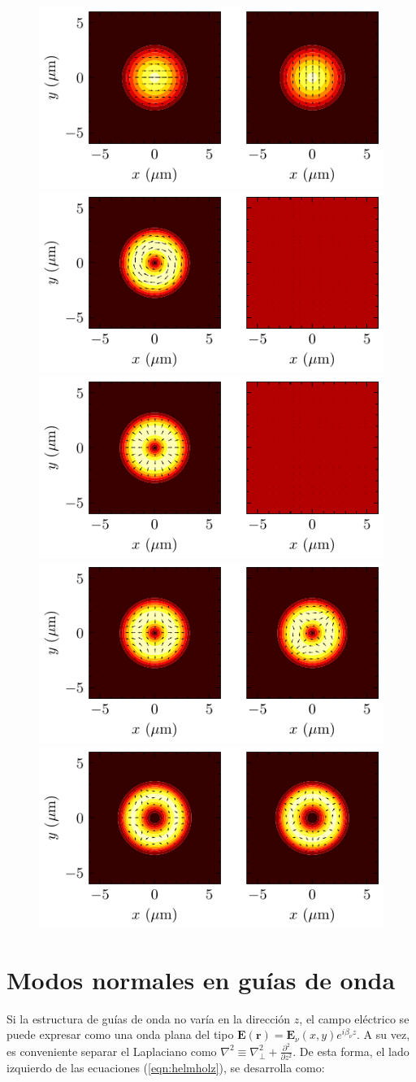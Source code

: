 \begin{figure}[H]
	\includegraphics[width=0.5\linewidth, trim={0 0 3.5cm 0},clip]{media/fiberHE11.pdf}
	\includegraphics[width=0.33\linewidth, trim={1.2cm 0 3.9cm 0},clip]{media/fiberTE1.pdf}
	\includegraphics[width=0.33\linewidth, trim={1.2cm 0 3.9cm 0},clip]{media/fiberTM1.pdf}
		\includegraphics[width=0.33\linewidth, trim={1.2cm 0 3.9cm 0},clip]{media/fiberHE21.pdf}
		\includegraphics[width=0.33\linewidth, trim={1.2cm 0 3.9cm 0},clip]{media/fiberHE31.pdf}
		
\end{figure}

\section{Modos normales en guías de onda}

Si la estructura de guías de onda no varía en la dirección $z$, el campo eléctrico se puede expresar como una onda plana del tipo $\textbf{E}(\textbf{r}) = \textbf{E}_\nu(x, y) e^{i\beta_\nu z}$. A su vez, es conveniente separar el Laplaciano como $\nabla^2 \equiv \nabla_\perp^2 + \frac{\partial^2}{\partial z^2}$. De esta forma, el lado izquierdo de las ecuaciones (\ref{eqn:helmholz}), se desarrolla como:

